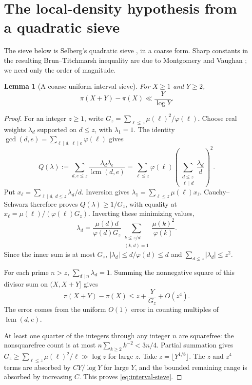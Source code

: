 \documentclass[11pt,letterpaper]{article}
\numberwithin{equation}{section}
\newtheorem{lemma}[theorem]{Lemma}
\theoremstyle{definition}
\theoremstyle{remark}
\newcommand{\lcm}{\operatorname{lcm}}
\begin{document}
\section{The local-density hypothesis from a quadratic sieve}\label{sec:sieve}

The sieve below is Selberg's quadratic sieve \cite{selberg-sieve}, in a
coarse form. Sharp constants in the resulting Brun--Titchmarsh inequality
are due to Montgomery and Vaughan \cite{mv}; we need only the order of
magnitude.

\begin{lemma}[A coarse uniform interval sieve]\label{lem:sieve}
For $X\ge1$ and $Y\ge2$,
\begin{equation}\label{eq:interval-sieve}
 \pi(X+Y)-\pi(X)\ll\frac{Y}{\log Y}.
\end{equation}
\end{lemma}
\begin{proof}
For an integer $z\ge1$, write
$G_z=\sum_{\ell\le z}\mu(\ell)^2/\varphi(\ell)$.
Choose real weights $\lambda_d$ supported on $d\le z$, with $\lambda_1=1$.
The identity $\gcd(d,e)=\sum_{\ell\mid d,\,\ell\mid e}\varphi(\ell)$ gives
\begin{equation}\label{eq:sieve-form}
 Q(\lambda):=\sum_{d,e\le z}\frac{\lambda_d\lambda_e}{\lcm(d,e)}
 =\sum_{\ell\le z}\varphi(\ell)
       \left(\sum_{\substack{d\le z\\\ell\mid d}}\frac{\lambda_d}{d}\right)^2.
\end{equation}
Put $x_\ell=\sum_{\ell\mid d,\,d\le z}\lambda_d/d$. Inversion gives
$\lambda_1=\sum_{\ell\le z}\mu(\ell)x_\ell$.
Cauchy--Schwarz therefore proves $Q(\lambda)\ge1/G_z$, with equality at
$x_\ell=\mu(\ell)/(\varphi(\ell)G_z)$. Inverting these minimizing values,
\[
 \lambda_d=\frac{\mu(d)d}{\varphi(d)G_z}
    \sum_{\substack{k\le z/d\\(k,d)=1}}\frac{\mu(k)^2}{\varphi(k)}.
\]
Since the inner sum is at most $G_z$, $|\lambda_d|\le d/\varphi(d)\le d$ and
$\sum_{d\le z}|\lambda_d|\le z^2$.

For each prime $n>z$, $\sum_{d\mid n}\lambda_d=1$.
Summing the nonnegative square of this divisor sum on $(X,X+Y]$ gives
\begin{equation}\label{eq:sieve-count}
 \pi(X+Y)-\pi(X)\le z+\frac{Y}{G_z}+O(z^4).
\end{equation}
The error comes from the uniform $O(1)$ error in counting multiples of
$\lcm(d,e)$.

At least one quarter of the integers through any integer $n$ are
squarefree: the nonsquarefree count is at most
$n\sum_{k\ge2}k^{-2}<3n/4$.
Partial summation gives
$G_z\ge\sum_{\ell\le z}\mu(\ell)^2/\ell\gg\log z$ for large $z$.
Take $z=\lfloor Y^{1/8}\rfloor$. The $z$ and $z^4$ terms are absorbed by
$CY/\log Y$ for large $Y$, and the bounded remaining range is absorbed
by increasing $C$. This proves \eqref{eq:interval-sieve}.
\end{proof}
\end{document}
